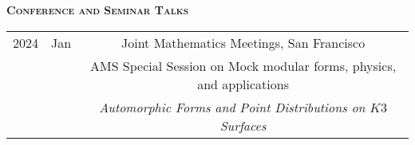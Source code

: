 \documentclass[11pt]{amsart}
\theoremstyle{remark}
\begin{document}
{\begin{enumerate}[label=\arabic*.]
\end{enumerate}

\large{\textbf{\textsc{Conference and Seminar Talks}}}

\bgroup
\def\arraystretch{1.3}
\begin{tabular}{ c c c }
2024 & Jan &  \hspace{-2in}Joint Mathematics Meetings, San Francisco \\
     &     & AMS Special Session on Mock modular forms, physics, and applications \\
     &     & \hspace{-0.80in}\textit{Automorphic Forms and Point Distributions on $K3$ Surfaces} \\
	
\end{tabular}


}
\end{document}
